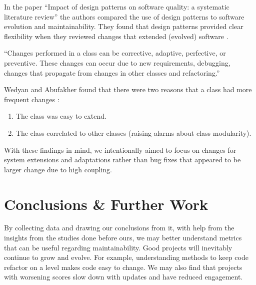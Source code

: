 \documentclass[12pt,conference]{IEEEtran}
\begin{document}
In the paper ``Impact of design patterns on software quality: a systematic literature review'' the authors compared the use of design patterns to software evolution and maintainability. They found that design patterns provided clear flexibility when they reviewed changes that extended (evolved) software \cite{wedyan:2020}.

\vspace{0.25cm}

\begin{displayquote}
``Changes performed in a class can be corrective, adaptive, perfective, or preventive. These changes can occur due to new requirements, debugging, changes that propagate from changes in other classes and refactoring.''
\end{displayquote}

\vspace{0.25cm}

Wedyan and Abufakher found that there were two reasons that a class had more frequent changes \cite{wedyan:2020}:

\vspace{0.25cm}

\begin{enumerate}
    \item The class was easy to extend.
    \item The class correlated to other classes (raising alarms about class modularity).
\end{enumerate}

\vspace{0.25cm}

With these findings in mind, we intentionally aimed to focus on changes for system extensions and adaptations rather than bug fixes that appeared to be larger change due to high coupling.


\vspace{0.5cm}
\section{Conclusions \& Further Work}
\vspace{0.25cm}

By collecting data and drawing our conclusions from it, with help from the insights from the studies done before ours, we may better understand metrics that can be useful regarding maintainability. Good projects will inevitably continue to grow and evolve. For example, understanding methods to keep code refactor on a level makes code easy to change. We may also find that projects with worsening scores slow down with updates and have reduced engagement.
\end{document}
